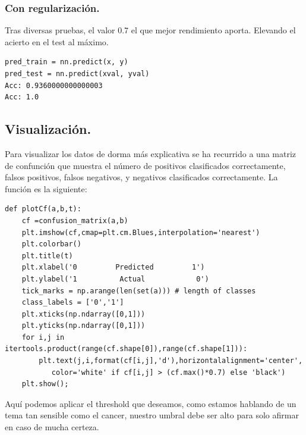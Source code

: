 \documentclass[a4paper,10pt]{article}
\begin{document}
\subsubsection{Con regularización.}
Tras diversas pruebas, el valor 0.7 el que mejor rendimiento aporta. Elevando el acierto en el test al máximo.
\begin{lstlisting}
pred_train = nn.predict(x, y)
pred_test = nn.predict(xval, yval)
Acc: 0.9360000000000003
Acc: 1.0
\end{lstlisting}
\subsection{Visualización.}
Para visualizar los datos de dorma más explicativa se ha recurrido a una matriz de confunción que muestra el número de positivos clasificados correctamente, falsos positivos, falsos negativos, y  negativos clasificados correctamente. La función es la siguiente:
\begin{lstlisting}
def plotCf(a,b,t):
    cf =confusion_matrix(a,b)
    plt.imshow(cf,cmap=plt.cm.Blues,interpolation='nearest')
    plt.colorbar()
    plt.title(t)
    plt.xlabel('0         Predicted         1')
    plt.ylabel('1          Actual            0')
    tick_marks = np.arange(len(set(a))) # length of classes
    class_labels = ['0','1']
    plt.xticks(np.ndarray([0,1]))
    plt.yticks(np.ndarray([0,1]))
    for i,j in itertools.product(range(cf.shape[0]),range(cf.shape[1])):
        plt.text(j,i,format(cf[i,j],'d'),horizontalalignment='center',
           color='white' if cf[i,j] > (cf.max()*0.7) else 'black')
    plt.show();
\end{lstlisting}
Aquí podemos aplicar el threshold que deseamos, como estamos hablando de un tema tan sensible como el cancer, nuestro umbral debe ser alto para solo afirmar en caso de mucha certeza.
\end{document}
